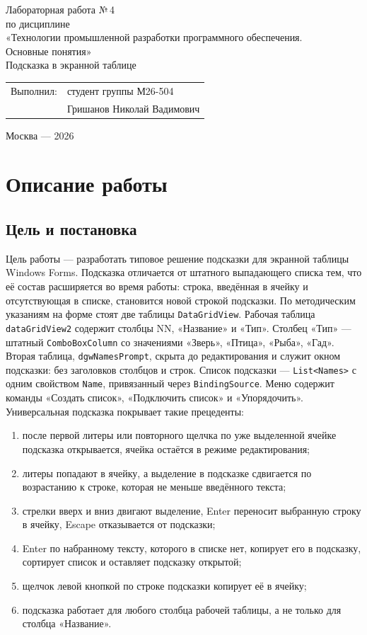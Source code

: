 \documentclass[a4paper,14pt]{extarticle}
\begin{document}
\begin{titlepage}
\centering
\vspace*{2.5cm}
{\Large Лабораторная работа №\,4}\\[10pt]
по дисциплине\\
«Технологии промышленной разработки программного обеспечения.\\
Основные понятия»\\[18pt]
{\large Подсказка в экранной таблице}\\[56pt]
\begin{flushleft}
\hspace{0.42\textwidth}
\begin{tabular}{ll}
Выполнил: & студент группы М26-504\\[8pt]
& Гришанов Николай Вадимович\\
\end{tabular}
\end{flushleft}
\vfill
Москва --- 2026
\end{titlepage}
\tableofcontents
\newpage
\section{Описание работы}
\subsection{Цель и постановка}
Цель работы --- разработать типовое решение подсказки для экранной таблицы Windows Forms. Подсказка отличается от штатного выпадающего списка тем, что её состав расширяется во время работы: строка, введённая в ячейку и отсутствующая в списке, становится новой строкой подсказки.
По методическим указаниям на форме стоят две таблицы \texttt{DataGridView}. Рабочая таблица \texttt{dataGridView2} содержит столбцы NN, «Название» и «Тип». Столбец «Тип» --- штатный \texttt{ComboBoxColumn} со значениями «Зверь», «Птица», «Рыба», «Гад». Вторая таблица, \texttt{dgwNamesPrompt}, скрыта до редактирования и служит окном подсказки: без заголовков столбцов и строк. Список подсказки --- \texttt{List<Names>} с одним свойством \texttt{Name}, привязанный через \texttt{BindingSource}. Меню содержит команды «Создать список», «Подключить список» и «Упорядочить».
Универсальная подсказка покрывает такие прецеденты:
\begin{enumerate}
\item после первой литеры или повторного щелчка по уже выделенной ячейке подсказка открывается, ячейка остаётся в режиме редактирования;
\item литеры попадают в ячейку, а выделение в подсказке сдвигается по возрастанию к строке, которая не меньше введённого текста;
\item стрелки вверх и вниз двигают выделение, Enter переносит выбранную строку в ячейку, Escape отказывается от подсказки;
\item Enter по набранному тексту, которого в списке нет, копирует его в подсказку, сортирует список и оставляет подсказку открытой;
\item щелчок левой кнопкой по строке подсказки копирует её в ячейку;
\item подсказка работает для любого столбца рабочей таблицы, а не только для столбца «Название».
\end{enumerate}
\end{document}
